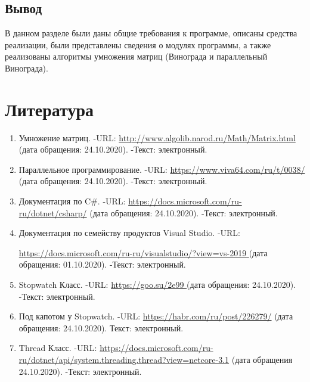 \documentclass[14pt, a4paper]{extarticle}
\begin{document}
\subsection{Вывод}
В данном разделе были даны общие требования к программе, описаны средства реализации, были представлены сведения о модулях программы, а также реализованы алгоритмы умножения матриц (Винограда и параллельный Винограда).


\clearpage
\section*{Литература}
\begin{enumerate}
	\label{literature}
	\item Умножение матриц. -URL: \href{http://www.algolib.narod.ru/Math/Matrix.html}{http://www.algolib.narod.ru/Math/Matrix.html} (дата обращения: 24.10.2020). -Текст: электронный.
	\item Параллельное программирование. -URL: \href{https://www.viva64.com/ru/t/0038/}{https://www.viva64.com/ru/t/0038/} (дата обращения: 24.10.2020). -Текст: электронный.
	\item  Документация по C\#. -URL: \href{https://docs.microsoft.com/ru-ru/dotnet/csharp/}{https://docs.microsoft.com/ru-ru/dotnet/csharp/} (дата обращения: 24.10.2020). -Текст: электронный.
	\item Документация по семейству продуктов Visual Studio. -URL:\par \href{https://docs.microsoft.com/ru-ru/visualstudio/?view=vs-2019}{https://docs.microsoft.com/ru-ru/visualstudio/?view=vs-2019 } (дата обращения: 01.10.2020). -Текст: электронный.
	\item Stopwatch Класс. -URL: \href{https://goo.su/2e99}{https://goo.su/2e99 } (дата обращения: 24.10.2020). -Текст: электронный.
	\item Под капотом у Stopwatch. -URL:  \href{https://habr.com/ru/post/226279/}{https://habr.com/ru/post/226279/} (дата обращения: 24.10.2020). Текст: электронный.
	\item Thread Класс. -URL: \href{https://docs.microsoft.com/ru-ru/dotnet/api/system.threading.thread?view=netcore-3.1}{https://docs.microsoft.com/ru-ru/dotnet/api/system.threading.thread?view=netcore-3.1} (дата обращения 24.10.2020). -Текст: электронный.
\end{enumerate}
\end{document}
